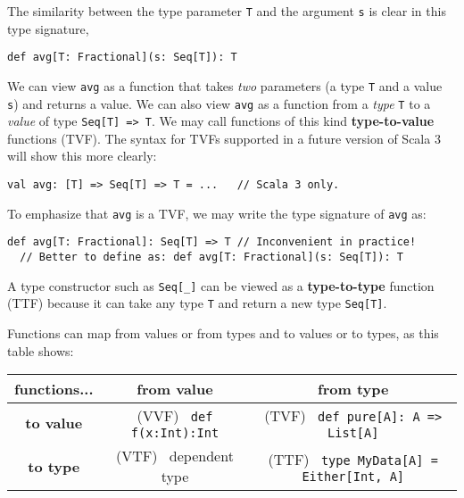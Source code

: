 The similarity between the type parameter \lstinline!T! and the argument
\lstinline!s! is clear in this type signature,
\begin{lstlisting}
def avg[T: Fractional](s: Seq[T]): T
\end{lstlisting}
\begin{comment}
def avg{[}T: Fractional{]}(s : Seq{[}T{]}): T = \{

val frac = implicitly{[}Fractional{[}T{]}{]}

frac.div(s.sum, frac.fromInt(s.length)) 

\}
\end{comment}
We can view \lstinline!avg! as a function that takes \emph{two} parameters
(a type \lstinline!T! and a value \lstinline!s!) and returns a value.
We can also view \lstinline!avg! as a function from a \emph{type}
\lstinline!T! to a \emph{value} of type \lstinline!Seq[T] => T!.
We may call functions of this kind \textbf{type-to-value}
functions (TVF). The syntax for TVFs supported in a future version
of Scala 3 will show this more clearly:
\begin{lstlisting}
val avg: [T] => Seq[T] => T = ...   // Scala 3 only.
\end{lstlisting}
To emphasize that \lstinline!avg! is a TVF, we may write the type
signature of \lstinline!avg! as:
\begin{lstlisting}
def avg[T: Fractional]: Seq[T] => T // Inconvenient in practice!
  // Better to define as: def avg[T: Fractional](s: Seq[T]): T
\end{lstlisting}

A type constructor such as \lstinline!Seq[_]! can be viewed as a
\textbf{type-to-type} function (TTF)
because it can take any type \lstinline!T! and return a new type
\lstinline!Seq[T]!.

Functions can map from values or from types and to values or to types,
as this table shows:
\begin{center}
\begin{tabular}{|c|c|c|}
\hline 
\textbf{\small{}functions...} & \textbf{\small{}from value} & \textbf{\small{}from type}\tabularnewline
\hline 
\hline 
\textbf{\small{}to value} & {\small{}(VVF)~ }\lstinline!def f(x:Int):Int! & {\small{}(TVF)~ }\lstinline!def pure[A]: A => List[A]!\tabularnewline
\hline 
\textbf{\small{}to type} & {\small{}(VTF)~ dependent type} & {\small{}(TTF)~ }\lstinline!type MyData[A] = Either[Int, A]!\tabularnewline
\hline 
\end{tabular}
\par\end{center}

